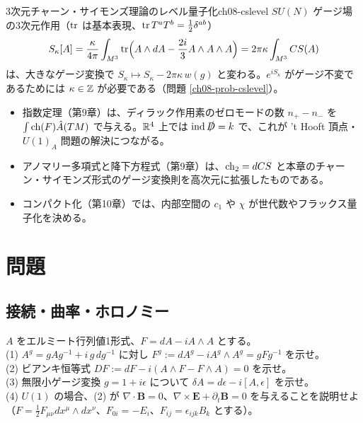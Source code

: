 \begin{myprop}{3次元チャーン・サイモンズ理論のレベル量子化}{ch08-cslevel}
$SU(N)$ ゲージ場の3次元作用（$\tr$ は基本表現、$\tr T^aT^b=\tfrac12\delta^{ab}$）
\[
S_\kappa[A]=\frac{\kappa}{4\pi}\int_{M^3}\tr\Bigl(A\wedge dA-\frac{2i}{3}A\wedge A\wedge A\Bigr)=2\pi\kappa\int_{M^3}CS(A)
\]
は、大きなゲージ変換で $S_\kappa\mapsto S_\kappa-2\pi\kappa\,w(g)$ と変わる。$e^{iS_\kappa}$ がゲージ不変であるためには $\kappa\in\mathbb{Z}$ が必要である（問題 \ref{ch08-prob-cslevel}）。
\end{myprop}

\begin{physbox}[：本章の公式の使いどころ]
\begin{itemize}
\item 指数定理（第9章）は、ディラック作用素のゼロモードの数 $n_+-n_-$ を $\int\operatorname{ch}(F)\hat{A}(TM)$ で与える。$\mathbb{R}^4$ 上では $\operatorname{ind}\slashed D=k$ で、これが 't Hooft 頂点・$U(1)_A$ 問題の解決につながる。
\item アノマリー多項式と降下方程式（第9章）は、$\operatorname{ch}_2=dCS$ と本章のチャーン・サイモンズ形式のゲージ変換則を高次元に拡張したものである。
\item コンパクト化（第10章）では、内部空間の $c_1$ や $\chi$ が世代数やフラックス量子化を決める。
\end{itemize}
\end{physbox}

\section{問題}

\subsection{接続・曲率・ホロノミー}

\begin{problem}[難易度 A]\label{ch08-prob-bianchi}
$A$ をエルミート行列値1形式、$F=dA-iA\wedge A$ とする。\\
(1) $A^g=gAg^{-1}+i\,g\,dg^{-1}$ に対し $F^g:=dA^g-iA^g\wedge A^g=gFg^{-1}$ を示せ。\\
(2) ビアンキ恒等式 $DF:=dF-i(A\wedge F-F\wedge A)=0$ を示せ。\\
(3) 無限小ゲージ変換 $g=1+i\epsilon$ について $\delta A=d\epsilon-i[A,\epsilon]$ を示せ。\\
(4) $U(1)$ の場合、(2) が $\nabla\cdot\bm B=0$、$\nabla\times\bm E+\partial_t\bm B=0$ を与えることを説明せよ（$F=\tfrac12F_{\mu\nu}dx^\mu\wedge dx^\nu$、$F_{0i}=-E_i$、$F_{ij}=\epsilon_{ijk}B_k$ とする）。
\end{problem}

